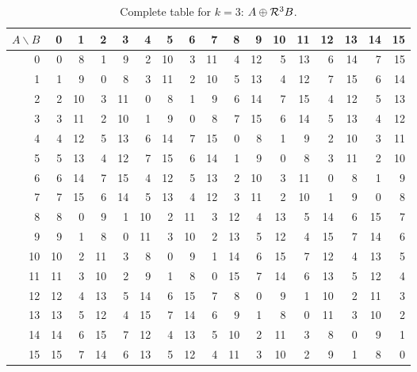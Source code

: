 \begin{table}[!htbp]\centering\small
\setlength{\tabcolsep}{5.0pt}\renewcommand{\arraystretch}{1.10}
\begin{tabular}{r|rrrrrrrrrrrrrrrr}\toprule
$A\backslash B$ & 0 & 1 & 2 & 3 & 4 & 5 & 6 & 7 & 8 & 9 & 10 & 11 & 12 & 13 & 14 & 15\\\midrule
0 & 0 & 8 & 1 & 9 & 2 & 10 & 3 & 11 & 4 & 12 & 5 & 13 & 6 & 14 & 7 & 15\\
1 & 1 & 9 & 0 & 8 & 3 & 11 & 2 & 10 & 5 & 13 & 4 & 12 & 7 & 15 & 6 & 14\\
2 & 2 & 10 & 3 & 11 & 0 & 8 & 1 & 9 & 6 & 14 & 7 & 15 & 4 & 12 & 5 & 13\\
3 & 3 & 11 & 2 & 10 & 1 & 9 & 0 & 8 & 7 & 15 & 6 & 14 & 5 & 13 & 4 & 12\\
4 & 4 & 12 & 5 & 13 & 6 & 14 & 7 & 15 & 0 & 8 & 1 & 9 & 2 & 10 & 3 & 11\\
5 & 5 & 13 & 4 & 12 & 7 & 15 & 6 & 14 & 1 & 9 & 0 & 8 & 3 & 11 & 2 & 10\\
6 & 6 & 14 & 7 & 15 & 4 & 12 & 5 & 13 & 2 & 10 & 3 & 11 & 0 & 8 & 1 & 9\\
7 & 7 & 15 & 6 & 14 & 5 & 13 & 4 & 12 & 3 & 11 & 2 & 10 & 1 & 9 & 0 & 8\\
8 & 8 & 0 & 9 & 1 & 10 & 2 & 11 & 3 & 12 & 4 & 13 & 5 & 14 & 6 & 15 & 7\\
9 & 9 & 1 & 8 & 0 & 11 & 3 & 10 & 2 & 13 & 5 & 12 & 4 & 15 & 7 & 14 & 6\\
10 & 10 & 2 & 11 & 3 & 8 & 0 & 9 & 1 & 14 & 6 & 15 & 7 & 12 & 4 & 13 & 5\\
11 & 11 & 3 & 10 & 2 & 9 & 1 & 8 & 0 & 15 & 7 & 14 & 6 & 13 & 5 & 12 & 4\\
12 & 12 & 4 & 13 & 5 & 14 & 6 & 15 & 7 & 8 & 0 & 9 & 1 & 10 & 2 & 11 & 3\\
13 & 13 & 5 & 12 & 4 & 15 & 7 & 14 & 6 & 9 & 1 & 8 & 0 & 11 & 3 & 10 & 2\\
14 & 14 & 6 & 15 & 7 & 12 & 4 & 13 & 5 & 10 & 2 & 11 & 3 & 8 & 0 & 9 & 1\\
15 & 15 & 7 & 14 & 6 & 13 & 5 & 12 & 4 & 11 & 3 & 10 & 2 & 9 & 1 & 8 & 0\\
\bottomrule\end{tabular}
\caption{Complete table for $k=3$: $A\oplus\mathcal R^3B$.}
\end{table}

\clearpage
\printbibliography[heading=bibintoc,title={References}]

